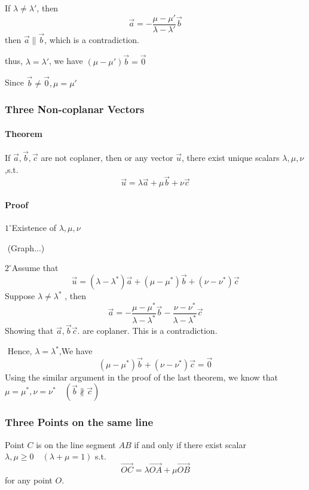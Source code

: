 \documentclass[11pt]{book}
\begin{document}
If $\lambda \neq \lambda '$, then 
$$
\vec a  = - \frac {\mu - \mu '}{\lambda - \lambda  ' }\vec b
$$
then $\vec a \parallel \vec b$, which is a contradiction.

thus, $\lambda = \lambda '$, we have $(\mu - \mu ')\vec b = \vec 0$

Since $\vec b \neq \vec 0 , \mu = \mu '$


\subsubsection{Three Non-coplanar Vectors}




\paragraph{Theorem} If $\vec a, \vec b , \vec c$ are not coplaner, then or any vector $\vec u$, there exist unique scalars $\lambda,\mu,\nu$,s.t.
$$
\vec u =\lambda \vec a+ \mu \vec b + \nu \vec c
$$
\paragraph{Proof} 
$1^{\circ}$Existence of $\lambda,\mu ,\nu $

​			(Graph...)

​			$2^{\circ}$Assume that 
$$
\vec u = (\lambda  - \lambda^*)\vec a + (\mu - \mu^*)\vec b + (\nu - \nu^*)\vec c
$$
​				Suppose $\lambda \neq \lambda^*$ , then 
$$
\vec a  = - \frac{\mu - \mu^*}{\lambda- \lambda^*}\vec b - \frac {\nu - \nu^*}{\lambda - \lambda^*}\vec c
$$
​				Showing that $\vec a,\vec b \vec c $. are coplaner. This is a contradiction. 

​				Hence, $\lambda = \lambda ^*$,We have 
$$
(\mu - \mu ^*)\vec b + (\nu - \nu ^*)\vec c = \vec 0 
$$
​				Using the similar argument in the proof of the last theorem, we know that  $\mu = \mu ^*,\nu = \nu ^*\quad (\vec b \not \parallel \vec c)$



\subsubsection{Three Points on the same line}

Point $C$ is on the line segment  $AB$ if and only if there exist scalar $\lambda ,\mu \geq 0 \quad (\lambda + \mu = 1)$ s.t. 
$$
\overrightarrow{OC} = \lambda \overrightarrow{OA} + \mu \overrightarrow{OB}
$$
for any point $O$.
\end{document}

